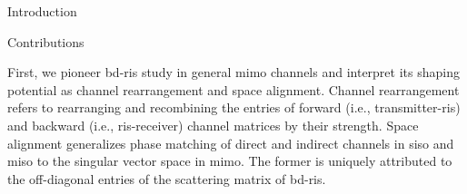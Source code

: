\documentclass[journal]{IEEEtran}
\begin{document}
\begin{section}{Introduction}
\begin{subsection}{Contributions}




		First, we pioneer \gls{bd}-\gls{ris} study in general \gls{mimo} channels and interpret its shaping potential as channel rearrangement and space alignment.
		Channel rearrangement refers to rearranging and recombining the entries of forward (i.e., transmitter-\gls{ris}) and backward (i.e., \gls{ris}-receiver) channel matrices by their strength.
		Space alignment generalizes phase matching of direct and indirect channels in \gls{siso} and \gls{miso} to the singular vector space in \gls{mimo}.
		The former is uniquely attributed to the off-diagonal entries of the scattering matrix of \gls{bd}-\gls{ris}.



\end{subsection}
\end{section}
\end{document}
